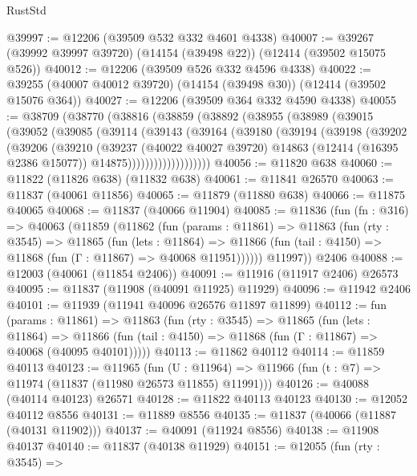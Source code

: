 \begin{lexlean}{RustStd}
\begin{coremodule}
{\begin{coremodule}
{{{{{{{{{{{{{{{{{{{{{{{{{{{{{{{{{{{{{{{{{{{{{{{{{{@39997 := @12206 (@39509 @532 @332 @4601 @4338)
@40007 := @39267 (@39992 @39997 @39720) (@14154 (@39498 @22)) (@12414 (@39502 @15075 @526))
@40012 := @12206 (@39509 @526 @332 @4596 @4338)
@40022 := @39255 (@40007 @40012 @39720) (@14154 (@39498 @30)) (@12414 (@39502 @15076 @364))
@40027 := @12206 (@39509 @364 @332 @4590 @4338)
@40055 := @38709
    (@38770
      (@38816
        (@38859
          (@38892
            (@38955
              (@38989
                (@39015
                  (@39052
                    (@39085
                      (@39114
                        (@39143
                          (@39164
                            (@39180
                              (@39194
                                (@39198
                                  (@39202
                                    (@39206
                                      (@39210
                                        (@39237
                                          (@40022 @40027 @39720)
                                          @14863
                                          (@12414 (@16395 @2386 @15077))
                                          @14875)))))))))))))))))))
@40056 := @11820 @638
@40060 := @11822 (@11826 @638) (@11832 @638)
@40061 := @11841 @26570
@40063 := @11837 (@40061 @11856)
@40065 := @11879 (@11880 @638)
@40066 := @11875 @40065
@40068 := @11837 (@40066 @11904)
@40085 := @11836
    (fun (fn : @316) =>
    @40063
      (@11859
        (@11862
          (fun (params : @11861) =>
          @11863
            (fun (rty : @3545) =>
            @11865
              (fun (lets : @11864) =>
              @11866 (fun (tail : @4150) => @11868 (fun (Γ : @11867) => @40068 @11951))))))
        @11997))
    @2406
@40088 := @12003 (@40061 (@11854 @2406))
@40091 := @11916 (@11917 @2406) @26573
@40095 := @11837 (@11908 (@40091 @11925) @11929)
@40096 := @11942 @2406
@40101 := @11939 (@11941 @40096 @26576 @11897 @11899)
@40112 := fun (params : @11861) =>
  @11863
    (fun (rty : @3545) =>
    @11865
      (fun (lets : @11864) =>
      @11866 (fun (tail : @4150) => @11868 (fun (Γ : @11867) => @40068 (@40095 @40101)))))
@40113 := @11862 @40112
@40114 := @11859 @40113
@40123 := @11965
    (fun (U : @11964) => @11966 (fun (t : @7) => @11974 (@11837 (@11980 @26573 @11855) @11991)))
@40126 := @40088 (@40114 @40123) @26571
@40128 := @11822 @40113 @40123
@40130 := @12052 @40112 @8556
@40131 := @11889 @8556
@40135 := @11837 (@40066 (@11887 (@40131 @11902)))
@40137 := @40091 (@11924 @8556)
@40138 := @11908 @40137
@40140 := @11837 (@40138 @11929)
@40151 := @12055
    (fun (rty : @3545) =>
}}}}}}}}}}}}}}}}}}}}}}}}}}}}}}}}}}}}}}}}}}}}}}}}}}
\end{coremodule}}
\end{coremodule}
\end{lexlean}

